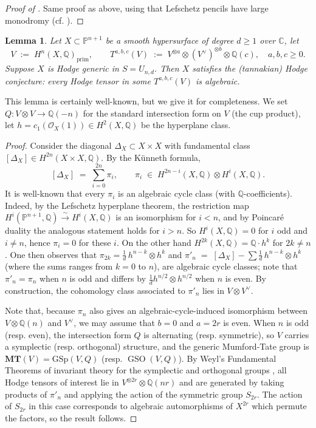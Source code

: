 \documentclass[10pt]{article}
\newcommand{\GSp}{\mathrm{GSp}}
\numberwithin{equation}{section}
\theoremstyle{plain}
\newtheorem{lem}[thm]{Lemma}
\theoremstyle{definition}
\theoremstyle{remark}
\newcommand{\MT}{\mathbf{MT}}
\newcommand{\C}{\mathbb{C}}
\newcommand{\Q}{\mathbb{Q}}
\newcommand{\PP}{\mathbb{P}}
\begin{document}
\begin{proof}[Proof of ]
    Same proof as above, using that Lefschetz pencils have large monodromy (cf. \cite[Exposé XVII]{zbMATH03407568}).
\end{proof}



\begin{lem}\label{lem:HC-generic}
  Let $X \subset \PP^{n+1}$ be a smooth hypersurface of degree $d \geq 1$ over $\C$, let
  \[
    V \;:=\; H^{n}(X,\Q)_{\textrm{prim}}, \qquad
    T^{a,b,c}(V) \;:=\; V^{\otimes a} \otimes (V^{\vee})^{\otimes b}\otimes \Q(c),
    \quad a,b,c \ge 0.
  \]
Suppose $X$ is Hodge generic in $S=U_{n,d}$. Then $X$ satisfies the (tannakian) Hodge conjecture: every Hodge tensor in some $T^{a,b,c}(V)$ is algebraic. 
 
\end{lem}
This lemma is certainly well-known, but we give it for completeness. We set $Q \colon V \otimes V \to \Q(-n)$ for the standard intersection form on $V$ (the cup product), let $h = c_1(\mathcal{O}_X(1)) \in H^2(X,\Q)$ be the hyperplane class.
\begin{proof}
Consider the diagonal $\Delta_X \subset X \times X$ with fundamental class $[\Delta_X] \in H^{2n}(X \times X, \Q)$. By the K\"{u}nneth formula,
\[
    [\Delta_X] \;=\; \sum_{i=0}^{2n} \pi_i,
    \qquad
    \pi_i \;\in\; H^{2n-i}(X,\Q) \otimes H^{i}(X,\Q).
\]
It is well-known that every $\pi_i$ is an algebraic cycle class (with $\Q$-coefficients). Indeed, by the Lefschetz hyperplane theorem, the restriction map $H^i(\PP^{n+1},\Q) \xrightarrow{\;\sim\;} H^i(X,\Q)$ is an isomorphism for $i < n$, and by Poincar\'{e} duality the analogous statement holds for $i > n$. So $H^i(X,\Q) = 0$ for $i$ odd and $i \ne n$, hence $\pi_i = 0$ for these $i$. On the other hand $H^{2k}(X,\Q) = \Q \cdot h^k$ for $2k \ne n$. One then observes that $\pi_{2k} =\frac{1}{d}\,h^{n-k} \otimes h^k$ and $\pi'_n \;=\; [\Delta_X]-\sum \frac{1}{d}\,h^{n-k} \otimes h^{k}$ (where the sums ranges from $k=0$ to $n$), are algebraic cycle classes; note that $\pi'_n = \pi_n$ when $n$ is odd and differs by $\frac{1}{d} h^{n/2} \otimes h^{n/2}$ when $n$ is even. By construction, the cohomology class associated to $\pi'_{n}$ lies in $V \otimes V^{\vee}$.

Note that, because $\pi_{n}$ also gives an algebraic-cycle-induced isomorphism between $V \otimes \mathbb{Q}(n)$ and $V^{\vee}$, we may assume that $b = 0$ and $a = 2r$ is even. When $n$ is odd (resp. even), the intersection form $Q$ is alternating (resp. symmetric),
so $V$ carries a symplectic (resp. orthogonal) structure, and the generic Mumford-Tate group is $\MT(V) = \GSp(V, Q) $ (resp. $ \operatorname{GSO}(V, Q)$). By Weyl's Fundamental Theorems of invariant theory for the symplectic and orthogonal groups \cite[Ch. 17,18]{FultonHarris}, \cite[Thm. 1B]{zbMATH04103278} all Hodge tensors of interest lie in $V^{\otimes 2r} \otimes \mathbb{Q}(nr)$ and are generated by taking products of $\pi'_{n}$ and applying the action of the symmetric group $S_{2r}$. The action of $S_{2r}$ in this case corresponds to algebraic automorphisms of $X^{2r}$ which permute the factors, so the result follows.
\end{proof}
\end{document}
